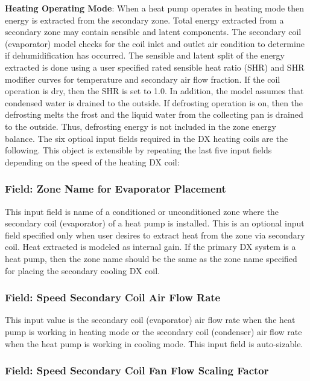 \textbf{Heating Operating Mode}: When a heat pump operates in heating mode then energy is extracted from the secondary zone. Total energy extracted from a secondary zone may contain sensible and latent components. The secondary coil (evaporator) model checks for the coil inlet and outlet air condition to determine if dehumidification has occurred. The sensible and latent split of the energy extracted is done using a user specified rated sensible heat ratio (SHR) and SHR modifier curves for temperature and secondary air flow fraction. If the coil operation is dry, then the SHR is set to 1.0. In addition, the model assumes that condensed water is drained to the outside. If defrosting operation is on, then the defrosting melts the frost and the liquid water from the collecting pan is drained to the outside. Thus, defrosting energy is not included in the zone energy balance. The six optioal input fields required in the DX heating coils are the following. This object is extensible by repeating the last five input fields depending on the speed of the heating DX coil:

\subsubsection{Field: Zone Name for Evaporator Placement}\label{field-zone-name-for-evaporator-placement-2}

This input field is name of a conditioned or unconditioned zone where the secondary coil (evaporator) of a heat pump is installed. This is an optional input field specified only when user desires to extract heat from the zone via secondary coil. Heat extracted is modeled as internal gain. If the primary DX system is a heat pump, then the zone name should be the same as the zone name specified for placing the secondary cooling DX coil.

\subsubsection{Field: Speed Secondary Coil Air Flow Rate}\label{field-speed-secondary-coil-air-flow-rate}

This input value is the secondary coil (evaporator) air flow rate when the heat pump is working in heating mode or the secondary coil (condenser) air flow rate when the heat pump is working in cooling mode. This input field is auto-sizable.

\subsubsection{Field: Speed Secondary Coil Fan Flow Scaling Factor}\label{field-speed-secondary-coil-fan-flow-scaling-factor}

